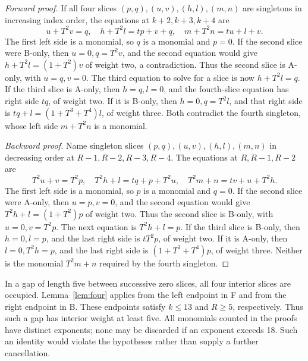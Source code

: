 \documentclass{article}
\begin{document}
\begin{proof}[Forward proof]
  If all four slices \((p,q), (u,v), (h,l), (m,n)\) are singletons in increasing index order, the
  equations at \(k + 2, k + 3, k + 4\) are
  \begin{equation}
    u + T^2 v = q, \quad h + T^2 l = tp + v + q, \quad m + T^2 n = tu + l + v.
  \end{equation}
  The first left side is a monomial, so \(q\) is a monomial and \(p = 0\). If the second slice
  were B-only, then \(u = 0, q = T^2 v\), and the second equation would give
  \(h + T^2 l = (1 + T^2) v\) of weight two, a contradiction. Thus the second slice is A-only,
  with \(u = q, v = 0\). The third equation to solve for a slice is now \(h + T^2 l = q\). If the
  third slice is A-only, then \(h = q, l = 0\), and the fourth-slice equation has right side
  \(tq\), of weight two. If it is B-only, then \(h = 0, q = T^2 l\), and that right side is
  \(tq + l = (1 + T^3 + T^4) l\), of weight three. Both contradict the fourth singleton, whose
  left side \(m + T^2 n\) is a monomial.

  \emph{Backward proof.} Name singleton slices \((p,q), (u,v), (h,l), (m,n)\) in decreasing order
  at \(R - 1, R - 2, R - 3, R - 4\). The equations at \(R, R - 1, R - 2\) are
  \begin{equation}
    T^2 u + v = T^2 p, \quad T^2 h + l = tq + p + T^2 u, \quad T^2 m + n = tv + u + T^2 h.
  \end{equation}
  The first left side is a monomial, so \(p\) is a monomial and \(q = 0\). If the second slice
  were A-only, then \(u = p, v = 0\), and the second equation would give
  \(T^2 h + l = (1 + T^2) p\) of weight two. Thus the second slice is B-only, with
  \(u = 0, v = T^2 p\). The next equation is \(T^2 h + l = p\). If the third slice is B-only,
  then \(h = 0, l = p\), and the last right side is \(t T^2 p\), of weight two. If it is A-only,
  then \(l = 0, T^2 h = p\), and the last right side is \((1 + T^3 + T^4) p\), of weight three.
  Neither is the monomial \(T^2 m + n\) required by the fourth singleton.
\end{proof}

In a gap of length five between successive zero slices, all four interior slices are occupied.
Lemma~\ref{lem:four} applies from the left endpoint in F and from the right endpoint in B. These
endpoints satisfy \(k \le 13\) and \(R \ge 5\), respectively. Thus such a gap has interior
weight at least five. All monomials counted in the proofs have distinct exponents; none may be
discarded if an exponent exceeds 18. Such an identity would violate the hypotheses rather than
supply a further cancellation.
\end{document}
